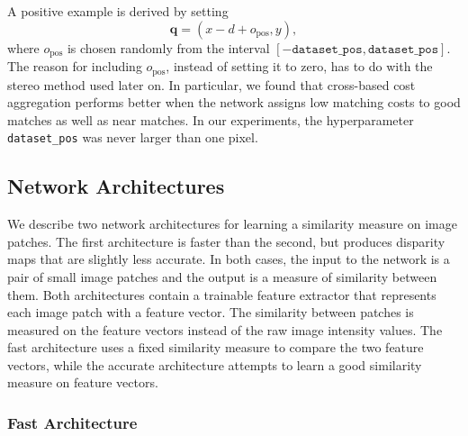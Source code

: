 \documentclass[twoside,11pt]{article}
\begin{document}
A positive example is derived by setting
%
\begin{equation*}
\mathbf{q} = (x - d + o_{\text{pos}}, y),
\end{equation*}
%
where $o_{\text{pos}}$ is chosen randomly from the interval
\([-\texttt{dataset\_pos}, \texttt{dataset\_pos}]\).  The reason for including
$o_{\text{pos}}$, instead of setting it to zero, has to do with the stereo
method used later on. In particular, we found that cross-based cost aggregation
performs better when the network assigns low matching costs to good matches as
well as near matches. In our experiments, the hyperparameter \texttt{dataset\_pos}
was never larger than one pixel.

\subsection{Network Architectures}

We describe two network architectures for learning a similarity measure on
image patches. The first architecture is faster than the second, but produces
disparity maps that are slightly less accurate. In both cases, the input to the
network is a pair of small image patches and the output is a measure of
similarity between them. Both architectures contain a trainable feature
extractor that represents each image patch with a feature vector. The
similarity between patches is measured on the feature vectors instead of the
raw image intensity values. The fast architecture uses a fixed similarity
measure to compare the two feature vectors, while the accurate architecture
attempts to learn a good similarity measure on feature vectors. 

\subsubsection{Fast Architecture}
\end{document}
